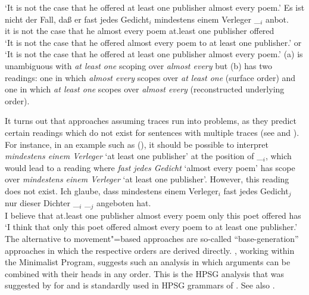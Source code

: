 \documentclass[output=paper,biblatex,babelshorthands,newtxmath,draftmode,colorlinks,citecolor=brown]{langscibook}
\begin{document}
\glt `It is not the case that he offered at least one publisher almost every poem.'
\ex 
\gll Es ist nicht der Fall, daß er fast jedes Gedicht$_i$ mindestens einem Verleger \_$_i$ anbot.\\
     it is not the case that he almost every poem at.least one publisher {} offered\\
\glt `It is not the case that he offered almost every poem to at least one publisher.' or
     `It is not the case that he offered at least one publisher almost every poem.'
\zl
(a) is unambiguous with \emph{at least one} scoping over \emph{almost every} but (b)
has two readings: one in which \emph{almost every} scopes over \emph{at least one} (surface order)
and one in which \emph{at least one} scopes over \emph{almost every} (reconstructed underlying order).

It turns out that approaches assuming traces run into problems, as they predict certain readings
which do not exist for\label{page-scrambling-scope}
sentences with multiple traces (see \citealp[]{Kiss2001a} and
\citealp[Section~2.6]{Fanselow2001a}). For instance, in an example such as (), it should be
possible to interpret \emph{mindestens einem Verleger} `at least one publisher' at the position of
\_$_i$, which would lead to a reading where \emph{fast jedes Gedicht} `almost every poem' has scope
over \emph{mindestens einem Verleger} `at least one publisher'. However, this reading does not exist.
\ea
\gll Ich glaube, dass mindestens einem Verleger$_i$ fast jedes Gedicht$_j$ nur dieser Dichter \_$_i$ \_$_j$ angeboten hat.\\
     I believe that at.least one publisher almost every poem only this poet {} {} offered has\\
\glt `I think that only this poet offered almost every poem to at least one publisher.'
\z
\largerpage[-1]
The alternative to movement"=based approaches are so-called ``base-generation'' approaches in which
the respective orders are derived directly. \citet{Fanselow2001a}, working within the Minimalist
Program, suggests such an analysis in which arguments can be combined with their heads in any
order. This is the HPSG analysis that was suggested by \citet[Section~4.1]{Gunji86a} for  and is
standardly used in HPSG grammars of 
\parencites[]{HN89a}[]{Kiss95b}[]{Meurers99b}[]{Mueller2005c}{MuellerGS}. See also \crossrefchaptert[\page
\pageref{hcs-binary}--\pageref{order:page-scrambling-end}]{order}.
\end{document}
